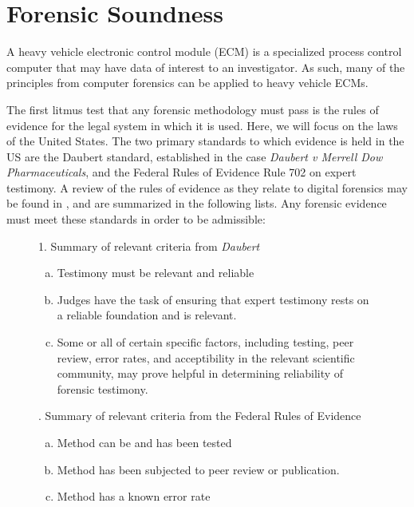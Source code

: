 \section{Forensic Soundness}

A heavy vehicle electronic control module (ECM) is a specialized process control computer that may have data of interest to an investigator. 
 As such, many of the principles from computer forensics can be applied to heavy vehicle ECMs.

The first litmus test that any forensic methodology must pass is the rules of evidence for the legal system in which it is used. Here, we will
focus on the laws of the United States. The two primary standards to which evidence is held in the US are the Daubert standard, established
in the case \emph{Daubert v Merrell Dow Pharmaceuticals}\cite{Daubert1993}, and the Federal Rules of Evidence Rule 702 on expert testimony\cite{FedRules702}. 
A review of the rules of evidence as they relate to 
digital forensics may be found in \cite{meyers2005}, and are summarized in the following lists. Any forensic
evidence must meet these standards in order to be admissible:

\begin{figure}[h]
1. Summary of relevant criteria from \emph{Daubert}
\begin{enumerate}[(a)]
  \item Testimony must be relevant and reliable
  \item Judges have the task of ensuring that expert testimony rests on a reliable
        foundation and is relevant.
  \item Some or all of certain specific factors, including testing, peer review, error
        rates, and acceptibility in the relevant scientific community, may prove helpful
        in determining reliability of forensic testimony.
\end{enumerate}


  . Summary of relevant criteria from the Federal Rules of Evidence
\begin{enumerate}[(a)]
  \item Method can be and has been tested
  \item Method has been subjected to peer review or publication.
  \item Method has a known error rate
\end{enumerate}

\label{ref:ch1fed}
\end{figure}

